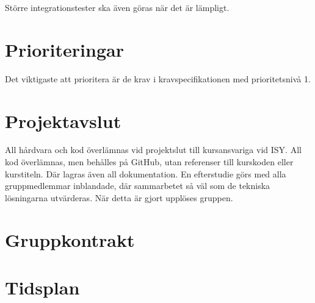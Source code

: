 \documentclass[a4paper,titlepage,12pt]{article}
\begin{document}
	Större integrationstester ska även göras när det är lämpligt.
	
	\section{Prioriteringar}
    Det viktigaste att prioritera är de krav i kravspecifikationen med
    prioritetsnivå 1.
	
	
	\section{Projektavslut}
	All hårdvara och kod överlämnas vid projektslut till kursansvariga vid ISY. All 
	kod överlämnas, men behålles på GitHub, utan referenser till kurskoden eller 
	kurstiteln. Där lagras även all dokumentation. En efterstudie görs med alla 
	gruppmedlemmar inblandade, där sammarbetet så väl som de tekniska lösningarna 
	utvärderas. När detta är gjort upplöses gruppen.

\begin{appendices}
	\section{Gruppkontrakt\label{app:gruppkontrakt}}
	\section{Tidsplan\label{app:tidsplan}}
\end{appendices}
\end{document}
